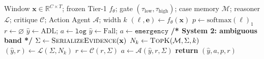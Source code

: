 \begin{algorithm}[!t]
\caption{RCDP inference for one IMU window}
\label{alg:rcdp}
\begin{algorithmic}[1]
\REQUIRE Window $\mathbf{x}\in\mathbb{R}^{C\times T}$; frozen Tier-1 $f_\theta$; gate $(\tau_{\mathrm{low}},\tau_{\mathrm{high}})$; case memory $\mathcal{M}$; reasoner $\mathcal{L}$; critique $\mathcal{C}$; Action Agent $\mathcal{A}$; width $k$
\STATE $(\boldsymbol{\ell},\mathbf{e})\leftarrow f_\theta(\mathbf{x})$ 
\STATE $p\leftarrow \mathrm{softmax}(\boldsymbol{\ell})_1$ 
\STATE $r\leftarrow\varnothing$ 
  \STATE $\hat{y}\leftarrow\mathrm{ADL}$; \; $a\leftarrow\texttt{log}$ 
  \STATE $\hat{y}\leftarrow\mathrm{Fall}$; \; $a\leftarrow\texttt{emergency}$ 
\ELSE
  \STATE \textbf{/* System 2: ambiguous band */}
  \STATE $\Sigma\leftarrow\textsc{SerializeEvidence}(\mathbf{x})$
  \STATE $N_k\leftarrow\textsc{TopK}(\mathcal{M},\Sigma,k)$ 
  \STATE $(\hat{y},r)\leftarrow\mathcal{L}(\Sigma,N_k)$ 
  \STATE $r\leftarrow\mathcal{C}(r,\Sigma)$ 
  \STATE $a\leftarrow\mathcal{A}(\hat{y},r,\Sigma)$ 
\ENDIF
\STATE \textbf{return} $(\hat{y},a,p,r)$
\end{algorithmic}
\end{algorithm}
